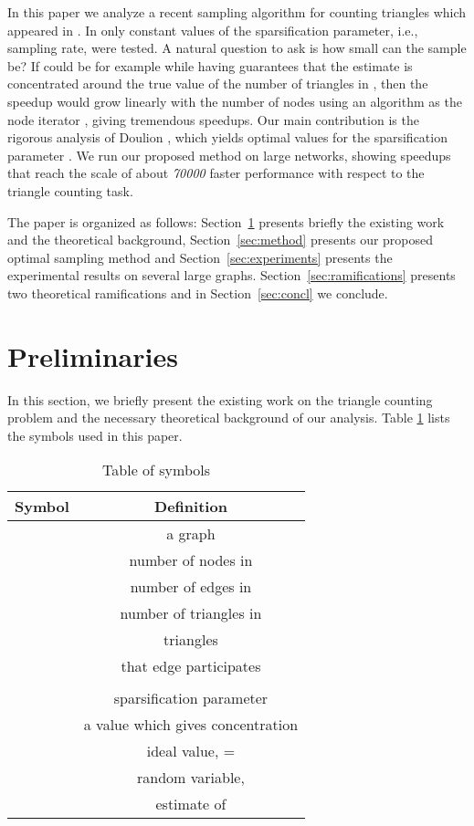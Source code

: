 \documentclass{llncs}
\newcommand{\hide}[1]{}
\begin{document}
In this paper we analyze a recent sampling algorithm for counting triangles
which appeared in \cite{Tsourakakiskdd09}. In \cite{Tsourakakiskdd09} 
only constant values of the sparsification parameter, i.e., sampling rate, 
were tested. A natural question to ask is how small can the sample be? 
If  could be for example  while having guarantees that the estimate
is concentrated around the true value of the number of triangles in , then 
the speedup would grow linearly with the number of nodes using an algorithm as the node iterator \cite{Tsourakakiskdd09}, 
giving tremendous speedups. 
Our main contribution is the rigorous analysis of Doulion \cite{Tsourakakiskdd09}, which yields optimal values
for the sparsification parameter . We run our proposed method on large networks, 
showing speedups that reach the scale of about \emph{70000} faster performance with respect to the triangle counting task. 

The paper is organized as follows: Section~\ref{sec:prelim} presents briefly
the existing work and the theoretical background, Section~\ref{sec:method} 
presents our proposed optimal sampling method and Section~\ref{sec:experiments} presents
the experimental results on several large graphs. Section~\ref{sec:ramifications} presents 
two theoretical ramifications and in Section~\ref{sec:concl} we conclude.


\section{Preliminaries}
\label{sec:prelim}

In this section, we briefly present the existing work on the triangle counting problem 
and the necessary theoretical background of our analysis. \hide{We end this section by briefly 
describing Hadoop, our implementation platform.} Table \ref{tab:Symbols} lists the symbols used in this paper.

\begin{table}[t]
	\centering
	\begin{tabular}{|c|c|} \hline \hline
Symbol & Definition \\ \hline \hline
   & a graph \\ \hline
   & number of nodes in  \\ \hline
   & number of edges in  \\ \hline
   & number of triangles in  \\ \hline
   &  triangles  \\ \hline
              & that edge  participates \\ 
	 &  \\ \hline
	  & sparsification parameter \\ \hline
	 & a  value which gives  
	          concentration \\ \hline
	 & ideal  value, =       \\    \hline
	  & random variable, \\
	     & estimate of \\ \hline \hline
\end{tabular}
	\caption{Table of symbols}
\label{tab:Symbols}
\end{table}
\end{document}
